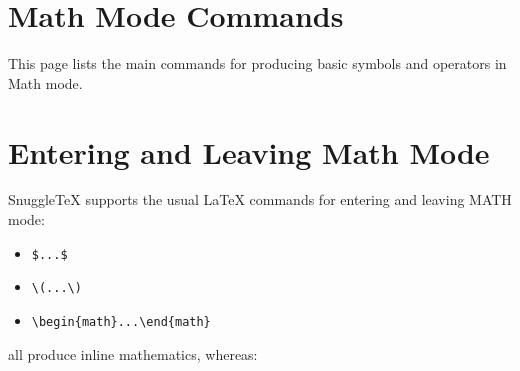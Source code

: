 
\section*{Math Mode Commands}

\newenvironment{demotable}
{\begin{center}
 \begin{tabular}{|r|c|}
 \hline \\
 Input & Result \\
 \hline \\
}{\hline
 \end{tabular}
 \end{center}
}

\newenvironment{ndemotable}
{\begin{center}
 \begin{tabular}{|l|c|l|}
 \hline \\
 Input & Result & Notes \\
 \hline \\
}{\hline
 \end{tabular}
 \end{center}
}

\newcommand{\minout}[1]{\verb|$ #1 $| & $#1$}
\newcommand{\dminout}[1]{\verb|$$ #1 $$| & $$#1$$}
\newcommand{\bigdminout}[1]{\begin{verbatim}\[
#1
\]\end{verbatim} & $$#1$$}
\newcommand{\note}[1]{\small #1}


This page lists the main commands for producing basic symbols and
operators in Math mode.

\section{Entering and Leaving Math Mode}

SnuggleTeX supports the usual LaTeX commands for entering and leaving
MATH mode:

\begin{itemize}
  \item \verb|$...$|
  \item \verb|\(...\)|
  \item \verb|\begin{math}...\end{math}|
\end{itemize}
all produce inline mathematics, whereas:

